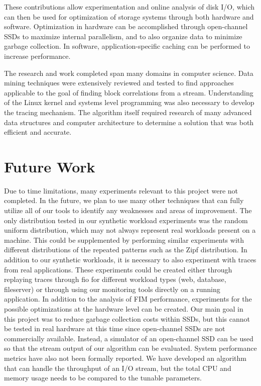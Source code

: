 \documentclass[MEng]{uofl}
\begin{document}
These contributions allow experimentation and online analysis of disk I/O, which can then be used for optimization of storage systems through both hardware and software. Optimization in hardware can be accomplished through open-channel SSDs to maximize internal parallelism, and to also organize data to minimize garbage collection. In software, application-specific caching can be performed to increase performance. 

The research and work completed span many domains in computer science. Data mining techniques were extensively reviewed and tested to find approaches applicable to the goal of finding block correlations from a stream. Understanding of the Linux kernel and systems level programming was also necessary to develop the tracing mechanism. The algorithm itself required research of many advanced data structures and computer architecture to determine a solution that was both efficient and accurate.

\chapter{Future Work}
Due to time limitations, many experiments relevant to this project were not completed. In the future, we plan to use many other techniques that can fully utilize all of our tools to identify any weaknesses and areas of improvement. The only distribution tested in our synthetic workload experiments was the random uniform distribution, which may not always represent real workloads present on a machine. This could be supplemented by performing similar experiments with different distributions of the repeated patterns such as the Zipf distribution. In addition to our synthetic workloads, it is necessary to also experiment with traces from real applications. These experiments could be created either through replaying traces through fio for different workload types (web, database, fileserver) or through using our monitoring tools directly on a running application. In addition to the analysis of FIM performance, experiments for the possible optimizations at the hardware level can be created. Our main goal in this project was to reduce garbage collection costs within SSDs, but this cannot be tested in real hardware at this time since open-channel SSDs are not commercially available. Instead, a simulator of an open-channel SSD can be used so that the stream output of our algorithm can be evaluated. System performance metrics have also not been formally reported. We have developed an algorithm that can handle the throughput of an I/O stream, but the total CPU and memory usage needs to be compared to the tunable parameters. 
\end{document}
